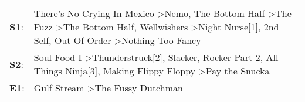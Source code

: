 \begin{supertabular}{p{0.03\textwidth}p{0.92\textwidth}}
 \textbf{S1}:  &  There's No Crying In Mexico\textsuperscript{} \textgreater \enspace Nemo\textsuperscript{}, \enspace The Bottom Half\textsuperscript{} \textgreater \enspace The Fuzz\textsuperscript{} \textgreater \enspace The Bottom Half\textsuperscript{}, \enspace Wellwishers\textsuperscript{} \textgreater \enspace Night Nurse[1]\textsuperscript{}, \enspace 2nd Self\textsuperscript{}, \enspace Out Of Order\textsuperscript{} \textgreater \enspace Nothing Too Fancy\textsuperscript{}  \enspace  \\
 \textbf{S2}:  &                                                                                                                                                            Soul Food I\textsuperscript{} \textgreater \enspace Thunderstruck[2]\textsuperscript{}, \enspace Slacker\textsuperscript{}, \enspace Rocker Part 2\textsuperscript{}, \enspace All Things Ninja[3]\textsuperscript{}, \enspace Making Flippy Floppy\textsuperscript{} \textgreater \enspace Pay the Snucka\textsuperscript{}  \enspace  \\
 \textbf{E1}:  &                                                                                                                                                                                                                                                                                                                                                                                                Gulf Stream\textsuperscript{} \textgreater \enspace The Fussy Dutchman\textsuperscript{}  \enspace  \\
\end{supertabular}

